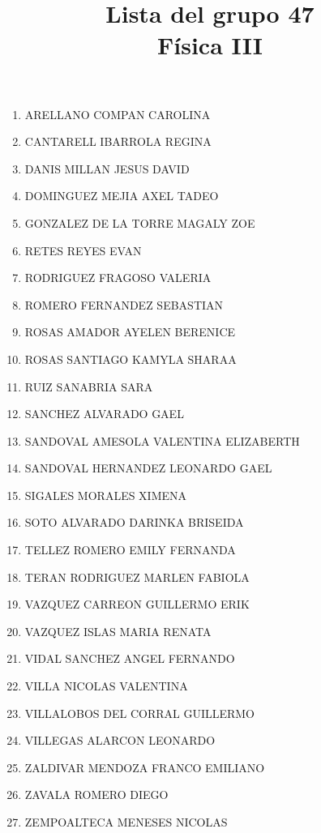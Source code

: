 \documentclass[14pt]{extarticle}
\title{\vspace*{-2cm} Lista del grupo 47 \\  Física III\vspace{-5ex}}
\date{}
\begin{document}
\maketitle

\large

\begin{enumerate}
\item ARELLANO COMPAN CAROLINA
\item CANTARELL IBARROLA REGINA
\item DANIS MILLAN JESUS DAVID
\item DOMINGUEZ MEJIA AXEL TADEO
\item GONZALEZ DE LA TORRE MAGALY ZOE
\item RETES REYES EVAN
\item RODRIGUEZ FRAGOSO VALERIA
\item ROMERO FERNANDEZ SEBASTIAN
\item ROSAS AMADOR AYELEN BERENICE
\item ROSAS SANTIAGO KAMYLA SHARAA
\item RUIZ SANABRIA SARA
\item SANCHEZ ALVARADO GAEL
\item SANDOVAL AMESOLA VALENTINA ELIZABERTH
\item SANDOVAL HERNANDEZ LEONARDO GAEL
\item SIGALES MORALES XIMENA
\item SOTO ALVARADO DARINKA BRISEIDA
\item TELLEZ ROMERO EMILY FERNANDA
\item TERAN RODRIGUEZ MARLEN FABIOLA
\item VAZQUEZ CARREON GUILLERMO ERIK
\item VAZQUEZ ISLAS MARIA RENATA
\item VIDAL SANCHEZ ANGEL FERNANDO
\item VILLA NICOLAS VALENTINA
\item VILLALOBOS DEL CORRAL GUILLERMO
\item VILLEGAS ALARCON LEONARDO
\item ZALDIVAR MENDOZA FRANCO EMILIANO
\item ZAVALA ROMERO DIEGO
\item ZEMPOALTECA MENESES NICOLAS
\end{enumerate}
\end{document}
